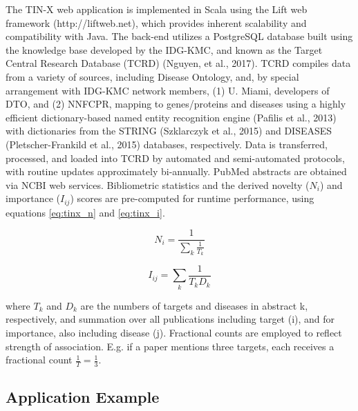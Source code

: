 The TIN-X web application is implemented in Scala using the Lift web framework (http://liftweb.net), which provides inherent scalability and compatibility with Java.  The back-end utilizes a PostgreSQL database built using the knowledge base developed by the IDG-KMC, and known as the Target Central Research Database (TCRD) (Nguyen, et al., 2017).  TCRD compiles data from a variety of sources, including Disease Ontology, and, by special arrangement with IDG-KMC network members, (1) U. Miami, developers of DTO, and (2) NNFCPR, mapping to genes/proteins and diseases using a highly efficient dictionary-based named entity recognition engine (Pafilis et al., 2013) with dictionaries from the STRING (Szklarczyk et al., 2015) and DISEASES (Pletscher-Frankild et al., 2015) databases, respectively.  Data is transferred, processed, and loaded into TCRD by automated and semi-automated protocols, with routine updates approximately bi-annually.  PubMed abstracts are obtained via NCBI web services.  Bibliometric statistics and the derived novelty ($N_i$) and importance ($I_{ij}$) scores are pre-computed for runtime performance, using equations \ref{eq:tinx_n} and \ref{eq:tinx_i}.

\begin{equation}
N_i = \frac{1}{\sum_{k}^{}\frac{1}{T_k}}
\label{eq:tinx_n}
\end{equation}

\begin{equation}
I_{ij} = \sum_{k}^{}\frac{1}{T_kD_k}
\label{eq:tinx_i}
\end{equation}

where $T_k$ and $D_k$ are the numbers of targets and diseases in abstract k, respectively, and summation over all publications including target (i), and for importance, also including disease (j). Fractional counts are employed to reflect strength of association.  E.g. if a paper mentions three targets, each receives a fractional count $\frac{1}{T} = \frac{1}{3}$.

\subsection{Application Example}

